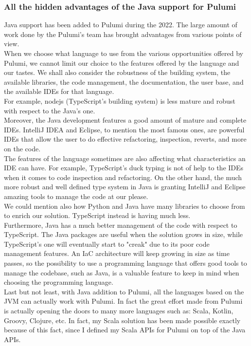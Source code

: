 \subsubsection{All the hidden advantages of the Java support for Pulumi}
Java support has been added to Pulumi during the 2022.
The large amount of work done by the Pulumi's team has brought advantages from various points of view.\\
When we choose what language to use from the various opportunities offered by Pulumi, we cannot limit our choice to the features offered by the language and our tastes.
We shall also consider the robustness of the building system, the available libraries, the code management, the documentation, the user base, and the available IDEs for that language.\\
For example, nodejs (TypeScript's building system) is less mature and robust with respect to the Java's one.\\
Moreover, the Java development features a good amount of mature and complete IDEs.
IntelliJ IDEA and Eclipse, to mention the most famous ones, are powerful IDEs that allow the user to do effective refactoring, inspection, reverts, and more on the code.\\
The features of the language sometimes are also affecting what characteristics an IDE can have.
For example, TypeScript's duck typing is not of help to the IDEs when it comes to code inspection and refactoring.
On the other hand, the much more robust and well defined type system in Java is granting IntelliJ and Eclipse amazing tools to manage the code at our please.\\
We could mention also how Python and Java have many libraries to choose from to enrich our solution.
TypeScript instead is having much less.\\
Furthermore, Java has a much better management of the code with respect to TypeScript.
The Java packages are useful when the solution grows in size, while TypeScript's one will eventually start to "creak" due to its poor code management features.
An IaC architecture will keep growing in size as time passes, so the possibility to use a programming language that offers good tools to manage the codebase, such as Java, is a valuable feature to keep in mind when choosing the programming language.\\
Last but not least, with Java addition to Pulumi, all the languages based on the JVM can actually work with Pulumi.
In fact the great effort made from Pulumi is actually opening the doors to many more languages such as: Scala, Kotlin, Groovy, Clojure, etc.
In fact, my Scala solution has been made possible exactly because of this fact, since I defined my Scala APIs for Pulumi on top of the Java APIs.


